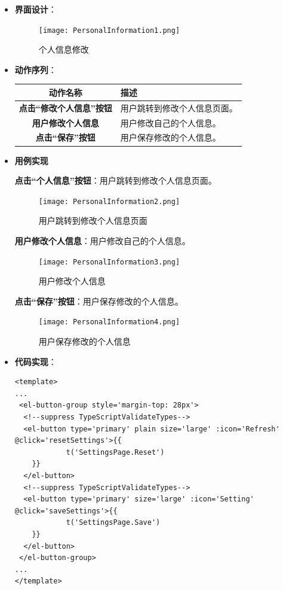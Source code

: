 \begin{itemize}
\item \textbf{界面设计}：
	\begin{figure}[H]
		\centering
		\texttt{[image: PersonalInformation1.png]}
		\caption{个人信息修改}
	\end{figure}
	\item \textbf{动作序列}：
	\begin{table}[H]
		\centering
		\renewcommand\arraystretch{1.5}
		\begin{tabular}{|c|>{\raggedright\arraybackslash}p{10cm}|}
			\hline
			\textbf{动作名称} & \textbf{描述} \\ \hline
			\textbf{点击“修改个人信息”按钮} & 用户跳转到修改个人信息页面。\\ \hline
			\textbf{用户修改个人信息} & 用户修改自己的个人信息。\\ \hline
			\textbf{点击“保存”按钮} & 用户保存修改的个人信息。\\ \hline
		\end{tabular}
	\end{table}

	\item \textbf{用例实现}

	\textbf{点击“个人信息”按钮}：用户跳转到修改个人信息页面。

	\begin{figure}[H]
		\centering
		\texttt{[image: PersonalInformation2.png]}
		\caption{用户跳转到修改个人信息页面}
	\end{figure}

	\textbf{用户修改个人信息}：用户修改自己的个人信息。

	\begin{figure}[H]
		\centering
		\texttt{[image: PersonalInformation3.png]}
		\caption{用户修改个人信息}
	\end{figure}

	\textbf{点击“保存”按钮}：用户保存修改的个人信息。

	\begin{figure}[H]
		\centering
		\texttt{[image: PersonalInformation4.png]}
		\caption{用户保存修改的个人信息}
	\end{figure}

	\item \textbf{代码实现}：
	\begin{verbatim}
<template>
...
 <el-button-group style='margin-top: 28px'>
  <!--suppress TypeScriptValidateTypes-->
  <el-button type='primary' plain size='large' :icon='Refresh' @click='resetSettings'>{{
			t('SettingsPage.Reset')
	}}
  </el-button>
  <!--suppress TypeScriptValidateTypes-->
  <el-button type='primary' size='large' :icon='Setting' @click='saveSettings'>{{
			t('SettingsPage.Save')
	}}
  </el-button>
 </el-button-group>
...
</template>
	\end{verbatim}

\end{itemize}

